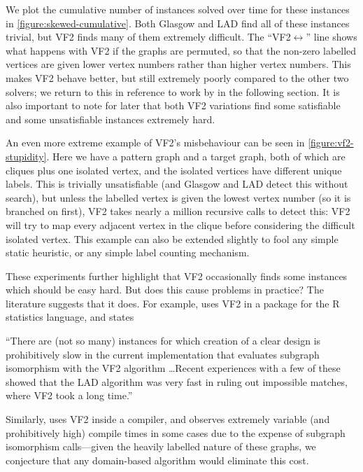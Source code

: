 \documentclass[twoside,11pt]{article}
\newcommand{\citet}[1]{\citeA{#1}}
\begin{document}
We plot the cumulative number of instances solved over time for these instances in
\cref{figure:skewed-cumulative}. Both Glasgow and LAD find all of these instances trivial, but VF2
finds many of them extremely difficult.  The ``VF2${\leftrightarrow}$'' line shows what happens with
VF2 if the graphs are permuted, so that the non-zero labelled vertices are given lower vertex
numbers rather than higher vertex numbers. This
makes VF2 behave better, but still extremely poorly compared to the other two solvers; we return to
this in reference to work by \citet{DBLP:conf/edbt/KatsarouNT17} in the following section.
It is also important to note for later that both VF2 variations find some satisfiable and some
unsatisfiable instances extremely hard.

An even more extreme example of VF2's misbehaviour can be seen in \cref{figure:vf2-stupidity}. Here
we have a pattern graph and a target graph, both of which are cliques plus one isolated vertex, and
the isolated vertices have different unique labels. This is trivially unsatisfiable (and Glasgow and
LAD detect this without search), but unless the labelled vertex is given the lowest vertex number
(so it is branched on first), VF2 takes nearly a million recursive calls to detect this: VF2 will
try to map every adjacent vertex in the clique before considering the difficult isolated vertex.
This example can also be extended slightly to fool any simple static heuristic, or any simple label
counting mechanism.

These experiments further highlight that VF2 occasionally finds some instances which should be easy hard.
But does this cause problems in practice? The literature suggests that it does. For example,
\citet{o:Gromping14} uses VF2 in a package for the R statistics language, and states
\begin{displayquote}``There are (not so many) instances for which creation of a clear design is
    prohibitively slow in the current implementation that evaluates subgraph isomorphism with the
    VF2 algorithm \ldots Recent experiences with a few of these showed that the LAD algorithm was
    very fast in ruling out impossible matches, where VF2 took a long time.''\end{displayquote}
Similarly, \citet{o:Murray12} uses VF2 inside a compiler, and observes extremely variable
(and prohibitively high) compile times in some cases due to the expense of subgraph isomorphism
calls---given the heavily labelled nature of these graphs, we conjecture that any domain-based
algorithm would eliminate this cost.
\end{document}
